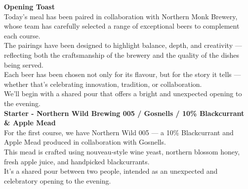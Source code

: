 \documentclass{lodgebrand}
\begin{document}








\newpage

\textbf{Opening Toast}\\
Today's meal has been paired in collaboration with Northern Monk Brewery, whose team has carefully selected a range of exceptional beers to complement each course.\\
The pairings have been designed to highlight balance, depth, and creativity — reflecting both the craftsmanship of the brewery and the quality of the dishes being served.\\
Each beer has been chosen not only for its flavour, but for the story it tells — whether that's celebrating innovation, tradition, or collaboration.\\

We'll begin with a shared pour that offers a bright and unexpected opening to the evening.\\
\vspace{4pt}\noindent{\color{black}\rule{\linewidth}{0.4pt}}\vspace{6pt}
\textbf{Starter - Northern Wild Brewing 005 / Gosnells / 10\% Blackcurrant \& Apple Mead}\\
For the first course, we have Northern Wild 005 — a 10\% Blackcurrant and Apple Mead produced in collaboration with Gosnells.\\
This mead is crafted using nouveau-style wine yeast, northern blossom honey, fresh apple juice, and handpicked blackcurrants.\\
It's a shared pour between two people, intended as an unexpected and celebratory opening to the evening.\\
\end{document}
